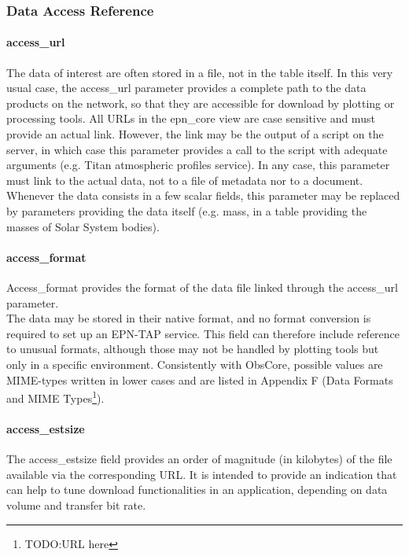 \documentclass[11pt,a4paper]{ivoa}
\begin{document}
\subsubsection{Data Access Reference}

\paragraph{access\_url}

The data of interest are often stored in a file, not in the table itself. In this very usual case, the access\_url parameter provides a complete path to the data products on the network, so that they are accessible for download by plotting or processing tools. All URLs in the epn\_core view are case sensitive and must provide an actual link. However, the link may be the output of a script on the server, in which case this parameter provides a call to the script with adequate arguments (e.g. Titan atmospheric profiles service). In any case, this parameter must link to the actual data, not to a file of metadata nor to a document.\\ Whenever the data consists in a few scalar fields, this parameter may be replaced by parameters providing the data itself (e.g. mass, in a table providing the masses of Solar System bodies).

\paragraph{access\_format}

Access\_format provides the format of the data file linked through the access\_url parameter. \\ The data may be stored in their native format, and no format conversion is required to set up an EPN-TAP service. This field can therefore include reference to unusual formats, although those may not be handled by plotting tools but only in a specific environment. Consistently with ObsCore, possible values are MIME-types written in lower cases and are listed in Appendix F (Data Formats and MIME Types\footnote{TODO:URL here}).

\paragraph{access\_estsize}

The access\_estsize field provides an order of magnitude (in kilobytes) of the file available via the corresponding URL. It is intended to provide an indication that can help to tune download functionalities in an application, depending on data volume and transfer bit rate.
\end{document}
